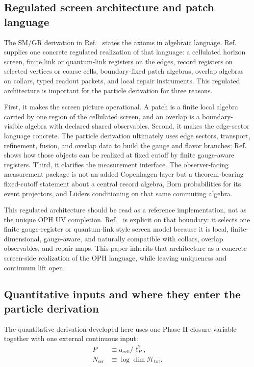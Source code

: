 \documentclass[11pt]{article}
\begin{document}
\subsection{Regulated screen architecture and patch language}

The SM/GR derivation in Ref.~\cite{ophcompact}
states the axioms in algebraic language. Ref.~\cite{ophmicrophysics} supplies one concrete regulated realization of that language: a cellulated horizon screen,
finite link or quantum-link registers on the edges, record registers on selected vertices or
coarse cells, boundary-fixed patch algebras, overlap algebras on collars, typed readout packets,
and local repair instruments. This regulated architecture is important for the particle derivation
for three reasons.

First, it makes the screen picture operational. A patch is a finite local
algebra carried by one region of the cellulated screen, and an overlap is a
boundary-visible algebra with declared shared observables. Second, it makes the edge-sector
language concrete. The particle derivation ultimately uses edge sectors, transport, refinement,
fusion, and overlap data to build the gauge and flavor branches; Ref.~\cite{ophmicrophysics} shows
how those objects can be realized at fixed cutoff by finite gauge-aware registers.
Third, it clarifies the measurement interface. The observer-facing measurement package is not an
added Copenhagen layer but a theorem-bearing fixed-cutoff statement about a central record
algebra, Born probabilities for its event projectors, and L\"uders conditioning on that same
commuting algebra.

This regulated architecture should be read as a reference implementation, not as the unique OPH
UV completion. Ref.~\cite{ophmicrophysics} is explicit on that boundary: it selects one finite
gauge-register or quantum-link style screen model because it is local, finite-dimensional,
gauge-aware, and naturally compatible with collars, overlap observables, and repair maps. This
paper inherits that architecture as a concrete screen-side realization of the OPH
language, while leaving uniqueness and continuum lift open.

\subsection{Quantitative inputs and where they enter the particle derivation}

The quantitative derivation developed here uses one Phase-II closure variable together with one
external continuous input:
\begin{align}
P &\equiv a_{\mathrm{cell}}/\ell_P^2,\\
N_{\mathrm{scr}} &\equiv \log \dim \mathcal H_{\mathrm{tot}}.
\end{align}
\end{document}
